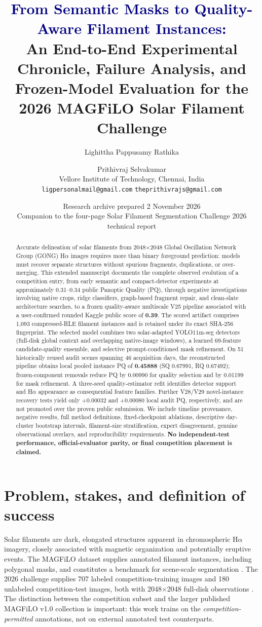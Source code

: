 \documentclass[11pt,a4paper]{article}
\title{\vspace{-1.2cm}\textcolor{navy}{\Large From Semantic Masks to Quality-Aware Filament Instances:}\\[0.25em]
\textbf{An End-to-End Experimental Chronicle, Failure Analysis, and Frozen-Model Evaluation for the 2026 MAGFiLO Solar Filament Challenge}}
\author{Lighittha Pappusamy Rathika \and Prithivraj Selvakumar\\[0.4em]
\small Vellore Institute of Technology, Chennai, India\\
\small \texttt{ligpersonalmail@gmail.com} \quad \texttt{theprithivrajs@gmail.com}}
\date{Research archive prepared 2 November 2026\\\small Companion to the four-page Solar Filament Segmentation Challenge 2026 technical report}
\begin{document}
\maketitle
\begin{abstract}
Accurate delineation of solar filaments from 2048$\times$2048 Global Oscillation Network Group (GONG) H$\alpha$ images requires more than binary foreground prediction: models must recover separate structures without spurious fragments, duplications, or over-merging. This extended manuscript documents the complete observed evolution of a competition entry, from early semantic and compact-detector experiments at approximately 0.31--0.34 public Panoptic Quality (PQ), through negative investigations involving native crops, ridge classifiers, graph-based fragment repair, and clean-slate architecture searches, to a frozen quality-aware multiscale V25 pipeline associated with a user-confirmed rounded Kaggle public score of \textbf{0.39}. The scored artifact comprises 1,093 compressed-RLE filament instances and is retained under its exact SHA-256 fingerprint. The selected model combines two solar-adapted YOLO11m-seg detectors (full-disk global context and overlapping native-image windows), a learned 69-feature candidate-quality ensemble, and selective prompt-conditioned mask refinement. On 51 historically reused audit scenes spanning 46 acquisition days, the reconstructed pipeline obtains local pooled instance PQ of \textbf{0.45888} (SQ 0.67991, RQ 0.67492); frozen-component removals reduce PQ by 0.00990 for quality selection and by 0.01199 for mask refinement. A three-seed quality-estimator refit identifies detector support and H$\alpha$ appearance as consequential feature families. Further V28/V29 novel-instance recovery tests yield only +0.00032 and +0.00080 local audit PQ, respectively, and are not promoted over the proven public submission. We include timeline provenance, negative results, full method definitions, fixed-checkpoint ablations, descriptive day-cluster bootstrap intervals, filament-size stratification, expert disagreement, genuine observational overlays, and reproducibility requirements. \textbf{No independent-test performance, official-evaluator parity, or final competition placement is claimed.}
\end{abstract}
\tableofcontents
\newpage

\section{Problem, stakes, and definition of success}
Solar filaments are dark, elongated structures apparent in chromospheric H$\alpha$ imagery, closely associated with magnetic organization and potentially eruptive events. The MAGFiLO dataset supplies annotated filament instances, including polygonal masks, and constitutes a benchmark for scene-scale segmentation \cite{magfilo}. The 2026 challenge supplies 707 labeled competition-training images and 180 unlabeled competition-test images, both with 2048$\times$2048 full-disk observations \cite{challenge}. The distinction between the competition subset and the larger published MAGFiLO v1.0 collection is important: this work trains on the \emph{competition-permitted} annotations, not on external annotated test counterparts.
\end{document}
